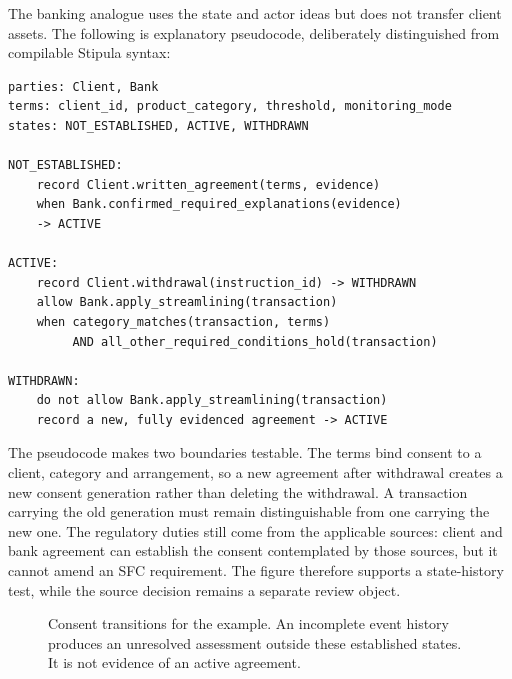 
The banking analogue uses the state and actor ideas but does not transfer client
assets. The following is explanatory pseudocode, deliberately distinguished
from compilable Stipula syntax:
\begin{lstlisting}[caption={A consent model inspired by Stipula. ``Record'' observes an event; ``allow'' describes the control's decision.}]
parties: Client, Bank
terms: client_id, product_category, threshold, monitoring_mode
states: NOT_ESTABLISHED, ACTIVE, WITHDRAWN

NOT_ESTABLISHED:
    record Client.written_agreement(terms, evidence)
    when Bank.confirmed_required_explanations(evidence)
    -> ACTIVE

ACTIVE:
    record Client.withdrawal(instruction_id) -> WITHDRAWN
    allow Bank.apply_streamlining(transaction)
    when category_matches(transaction, terms)
         AND all_other_required_conditions_hold(transaction)

WITHDRAWN:
    do not allow Bank.apply_streamlining(transaction)
    record a new, fully evidenced agreement -> ACTIVE
\end{lstlisting}
The pseudocode makes two boundaries testable. The terms bind consent to a
client, category and arrangement, so a new agreement after withdrawal creates a
new consent generation rather than deleting the withdrawal. A transaction
carrying the old generation must remain distinguishable from one carrying the
new one. The regulatory duties still come from the applicable sources: client
and bank agreement can establish the consent contemplated by those sources, but
it cannot amend an SFC requirement. The figure therefore supports a state-history
test, while the source decision remains a separate review object.

\begin{figure}[htbp]
\centering
{}
\caption{Consent transitions for the example. An incomplete event history produces
an unresolved assessment outside these established states. It is not evidence
of an active agreement.}
\label{fig:consent-tutorial}
\end{figure}

